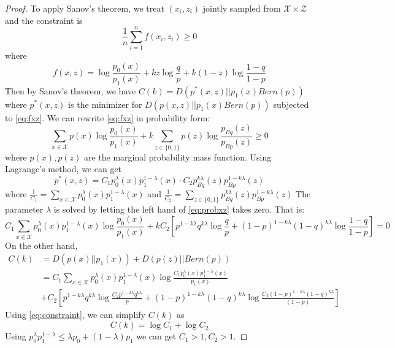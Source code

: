 \documentclass{article}
\begin{document}
\begin{proof}
	To apply Sanov's theorem, we treat $(x_i, z_i)$ jointly sampled from $\mathcal{X} \times \mathcal{Z}$
	and the constraint is 
	\begin{equation}\label{eq:fxz}	
	\frac{1}{n} \sum_{i=1}^n f(x_i, z_i) \geq 0
	\end{equation}	
	where
	$$
	f(x, z) = \log\frac{p_0(x)}{p_1(x)} + kz \log\frac{q}{p} + k(1-z) \log \frac{1-q}{1-p}
	$$
	Then by Sanov's theorem, we have $C(k) = D(p^*(x,z)|| p_1(x)Bern(p))$
	where $p^*(x,z)$ is the minimizer for $D(p(x,z)|| p_1(x)Bern(p))$ subjected to
	\eqref{eq:fxz}.
	We can rewrite \eqref{eq:fxz} in probability form:
	\begin{equation}\label{eq:probxz}
	\sum_{x\in \mathcal{X}} p(x) \log\frac{p_0(x)}{p_1(x)} + k\sum_{z \in \{0,1\}} p(z) \log\frac{p_{Bq}(z)}{p_{Bp}(z)} \geq 0
	\end{equation}
	where $p(x), p(z)$ are the marginal probability mass function.
	Using Lagrange's method, we can get
	\begin{equation}
	p^*(x,z) = C_1 p_0^{\lambda}(x)p_1^{1-\lambda}(x) \cdot C_2 p_{Bq}^{k\lambda}(z)p_{Bp}^{1-k\lambda}(z)
	\end{equation}
	where $\frac{1}{C_1} = \sum_{x\in\mathcal{X}}p_0^{\lambda}(x)p_1^{1-\lambda}(x) $
	and $\frac{1}{C_2} = \sum_{z\in \{0,1\}} p_{Bq}^{k\lambda}(z)p_{Bp}^{1-k\lambda}(z)$
	The parameter $\lambda$ is solved by letting the left hand of \eqref{eq:probxz} takes zero.
	That is:
	\begin{equation}\label{eq:constraint}
	C_1 \sum_{x\in \mathcal{X}} p_0^{\lambda}(x)p_1^{1-\lambda}(x)\log\frac{p_0(x)}{p_1(x)} + kC_2[p^{1-k\lambda}q^{k\lambda}\log\frac{q}{p} +
	(1-p)^{1-k\lambda}(1-q)^{k\lambda}\log\frac{1-q}{1-p} ] = 0
	\end{equation}
	On the other hand,
	\begin{align*}
	C(k) & = D(p(x)|| p_1(x)) + D(p(z) || Bern(p)) \\
	& = C_1\sum_{x\in \mathcal{X}} p_0^{\lambda}(x)p_1^{1-\lambda}(x)\log\frac{C_1  p_0^{\lambda}(x)p_1^{1-\lambda}(x)}{p_1(x)}  \\
	& + C_2[p^{1-k\lambda}q^{k\lambda}\log\frac{C_2 p^{1-k\lambda}q^{k\lambda}}{p} +
	(1-p)^{1-k\lambda}(1-q)^{k\lambda}\log\frac{C_2(1-p)^{1-k\lambda}(1-q)^{k\lambda}}{(1-p)} ] 
	\end{align*}
	Using \eqref{eq:constraint}, we can simplify $C(k)$ as
	\begin{equation}
	C(k) =  \log  C_1 + \log C_2
	\end{equation}
	Using $p_0^{\lambda} p_1^{1-\lambda} \leq \lambda p_0 + (1-\lambda) p_1$ we can get $C_1 > 1, C_2 > 1$.
	
\end{proof}
\end{document}
